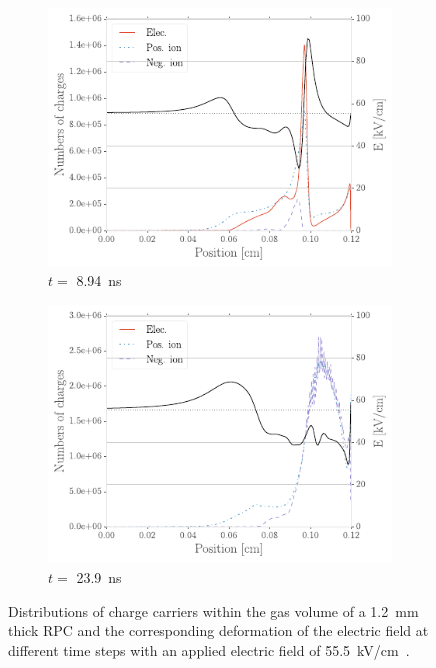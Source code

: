 \begin{figure}[H]
\begin{subfigure}{0.5\linewidth}
			\includegraphics[width = .95\linewidth]{fig/chapt3/Avalanche_dev_step3.pdf}
			\caption{\label{fig:Avalanche-develop:C}$t=$ \SI{8.94}{ns}}
		\end{subfigure}
		\begin{subfigure}{0.5\linewidth}
			\centering
			\includegraphics[width = .95\linewidth]{fig/chapt3/Avalanche_dev_step4.pdf}
			\caption{\label{fig:Avalanche-develop:D}$t=$ \SI{23.9}{ns}}
		\end{subfigure}
		\caption{\label{fig:Avalanche-develop} Distributions of charge carriers within the gas volume of a \SI{1.2}{mm} thick RPC and the corresponding deformation of the electric field at different time steps with an applied electric field of \SI{55.5}{kV/cm}~\cite{VINCENT2017}.}
	\end{figure}
	
